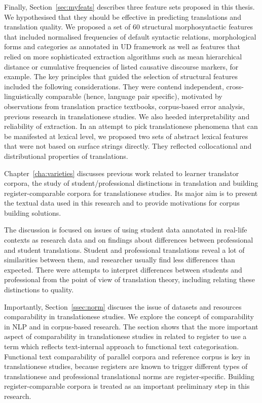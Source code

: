Finally, Section~\ref{sec:myfeats} describes three feature sets proposed in this thesis. We hypothesised that they should be effective in predicting translations and translation quality. We proposed a set of 60 structural morphosyntactic features that included normalised frequencies of default syntactic relations, morphological forms and categories as annotated in \gls{UD} framework as well as features that relied on more sophisticated extraction algorithms such as mean hierarchical distance or cumulative frequencies of listed causative discourse markers, for example. 
The key principles that guided the selection of structural features included the following considerations. They were contend independent, cross-linguistically comparable (hence, language pair specific), motivated by observations from translation practice textbooks, corpus-based error analysis, previous research in translationese studies. We also heeded interpretability and reliability of extraction.
In an attempt to pick translationese phenomena that can be manifested at lexical level, we proposed two sets of abstract lexical features that were not based on surface strings directly. They reflected collocational and distributional properties of translations. 

Chapter~\ref{cha:varieties} discusses previous work related to learner translator corpora, the study of student/professional distinctions in translation and building register-comparable corpora for translationese studies. Its major aim is to present the textual data used in this research and to provide motivations for corpus building solutions.

The discussion is focused on issues of using student data annotated in real-life contexts as research data and on findings about differences between professional and student translations. Student and professional translations reveal a lot of similarities between them, and researcher usually find less differences than expected. 
There were attempts to interpret differences between students and professional from the point of view of translation theory, including relating these distinctions to quality. 
 
Importantly, Section~\ref{ssec:norm} discuses the issue of datasets and resources comparability in translationese studies. We explore the concept of comparability in NLP and in corpus-based research. The section shows that the more important aspect of comparability in translationese studies in related to register to use a term which reflects text-internal approach to functional text categorisation. Functional text comparability of parallel corpora and reference corpus is key in translationese studies, because registers are known to trigger different types of translationese and  professional translational norms are register-specific. Building register-comparable corpora is treated as an important preliminary step in this research. 

